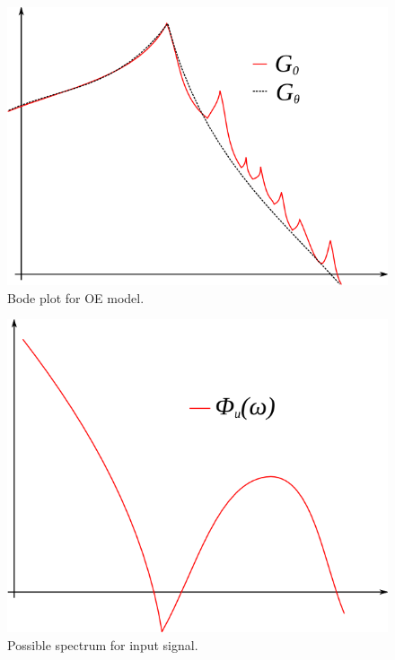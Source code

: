 \begin{figure}[ht!]
	\centering
	\includegraphics[width=.3\textwidth]{images/16oebode}
	\caption{Bode plot for OE model.}
	\label{fig:16oebode}
\end{figure}

\begin{figure}[ht!]
	\centering
	\includegraphics[width=.3\textwidth]{images/16uspec}
	\caption{Possible spectrum for input signal.}
	\label{fig:16uspec}
\end{figure}

